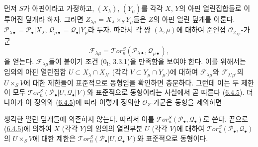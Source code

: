 \begin{env}[6.5.2]
\label{III.6.5.2-fr}
먼저 $S$가 아핀이라고 가정하고, $(X_\lambda)$, $(Y_\mu)$를 각각
$X$, $Y$의 아핀 열린집합들로 이루어진 덮개라 하자. 그러면
$Z_{\lambda\mu}=X_\lambda\times_S Y_\mu$들은 $Z$의 아핀 열린 덮개를
이룬다. $\mathscr P_{\lambda\bullet}=\mathscr P_\bullet|X_\lambda$,
$\mathscr Q_{\mu\bullet}=\mathscr Q_\bullet|Y_\mu$라 두자. 따라서 각
쌍 $(\lambda,\mu)$에 대하여 준연접 $\mathscr O_{Z_{\lambda\mu}}$-가군
\[
  \mathscr F_{\lambda\mu}
  =\mathscr{T}\!or_n^S
   (\mathscr P_{\lambda\bullet},\mathscr Q_{\mu\bullet}),
\]
을 얻는다. $\mathscr F_{\lambda\mu}$들이 붙이기 조건
($0_{\mathrm I}$, 3.3.1)을 만족함을 보여야 한다. 이를 위해서는 임의의
아핀 열린집합 $U\subset X_\lambda\cap X_{\lambda'}$ (각각
$V\subset Y_\mu\cap Y_{\mu'}$)에 대하여 $\mathscr F_{\lambda\mu}$와
$\mathscr F_{\lambda'\mu'}$의 $U\times_S V$에 대한 제한들이 표준적으로
동형임을 확인하면 충분하다. 그런데 이는 두 제한이 모두
$\mathscr{T}\!or_n^S(\mathscr P_\bullet|U,\mathscr Q_\bullet|V)$와
표준적으로 동형이라는 사실에서 곧 따른다
(\hyperref[III.6.4.5-fr]{6.4.5}). 더 나아가 이 정의와
(\hyperref[III.6.4.5-fr]{6.4.5})에 따라 이렇게 정의한
$\mathscr O_Z$-가군은 동형을 제외하면


생각한 열린 덮개들에 의존하지 않는다. 따라서 이를
$\mathscr{T}\!or_n^S(\mathscr P_\bullet,\mathscr Q_\bullet)$로 쓴다.
끝으로 (\hyperref[III.6.4.5-fr]{6.4.5})에 의하여 $X$ (각각 $Y$)의
임의의 열린부분 $U$ (각각 $V$)에 대하여
$\mathscr{T}\!or_n^S(\mathscr P_\bullet,\mathscr Q_\bullet)$의
$U\times_S V$에 대한 제한은
$\mathscr{T}\!or_n^S(\mathscr P_\bullet|U,\mathscr Q_\bullet|V)$와
표준적으로 동형이다.
\end{env}


